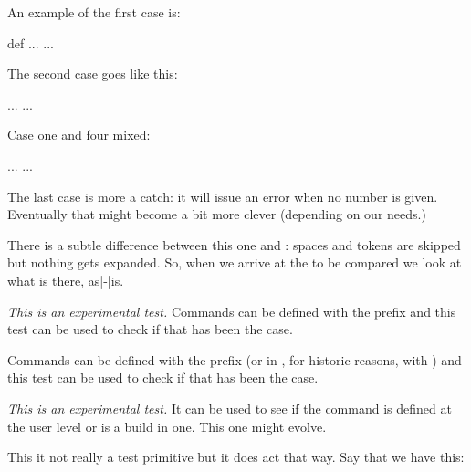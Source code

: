 An example of the first case is:

\starttyping[option=TEX]
 {def}%
  ...
\else
  ...
\fi
\stoptyping

The second case goes like this:

\starttyping[option=TEX]
\iftok\scratchtoksone\scratchtokstwo
  ...
\else
  ...
\fi
\stoptyping

Case one and four mixed:

\starttyping[option=TEX]
\TempX
  ...
\else
  ...
\fi
\stoptyping

The last case is more a catch: it will issue an error when no number is given.
Eventually that might become a bit more clever (depending on our needs.)

\stopsubsection

\startsubsection[title={\tex{ifcstok}}]

There is a subtle difference between this one and : spaces
and \type {\relax} tokens are skipped but nothing gets expanded. So, when
we arrive at the to be compared  we look at what is there,
as|-|is.

\stopsubsection

\startsubsection[title={\tex{iffrozen}}]

{\em This is an experimental test.} Commands can be defined with the \type
{\frozen} prefix and this test can be used to check if that has been the case.

\stopsubsection

\startsubsection[title={\tex{ifprotected}}]

Commands can be defined with the \type {\protected} prefix (or in \CONTEXT, for
historic reasons, with \type {\unexpanded}) and this test can be used to check if
that has been the case.

\stopsubsection

\startsubsection[title={\tex{ifusercmd}}]

{\em This is an experimental test.} It can be used to see if the command is
defined at the user level or is a build in one. This one might evolve.

\stopsubsection

\startsubsection[title={\tex{orelse}}]

This it not really a test primitive but it does act that way. Say that we have this:

\starttyping[option=TEX]
\ifdim\scratchdimen>10pt
    case 1
\else\ifdim\scratchdimen<20pt
    case 2
\else\ifcount\scratchcounter>10
    case 3
\else\ifcount\scratchcounter<20
    case 4
\fi\fi\fi\fi
\stoptyping

